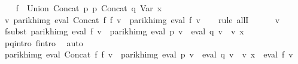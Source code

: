 \begin{isabellebody}
\ \ \isamarkupfalse%
\ {\isacharquery}{\kern0pt}f{\isacharprime}{\kern0pt}\ {\isacharequal}{\kern0pt}\ {\isachardoublequoteopen}Union\ {\isacharparenleft}{\kern0pt}Concat\ p{}\ p{}{\isacharparenright}{\kern0pt}\ {\isacharparenleft}{\kern0pt}Concat\ {\isacharquery}{\kern0pt}q{\isacharprime}{\kern0pt}\ {\isacharparenleft}{\kern0pt}Var\ x{\isacharparenright}{\kern0pt}{\isacharparenright}{\kern0pt}{\isachardoublequoteclose}\isanewline
\isanewline
\ \ \isamarkupfalse%
\ {\isachardoublequoteopen}{\isasymforall}v{\isachardot}{\kern0pt}\ {\isacharparenleft}{\kern0pt}parikh{\isacharunderscore}{\kern0pt}img\ {\isacharparenleft}{\kern0pt}eval\ {\isacharparenleft}{\kern0pt}Concat\ f{}\ f{}{\isacharparenright}{\kern0pt}\ v{\isacharparenright}{\kern0pt}\ {\isacharequal}{\kern0pt}\ parikh{\isacharunderscore}{\kern0pt}img\ {\isacharparenleft}{\kern0pt}eval\ {\isacharquery}{\kern0pt}f{\isacharprime}{\kern0pt}\ v{\isacharparenright}{\kern0pt}{\isacharparenright}{\kern0pt}{\isachardoublequoteclose}\isanewline
\ \ \isamarkupfalse%
\ {\isacharparenleft}{\kern0pt}rule\ allI{\isacharparenright}{\kern0pt}\isanewline
\ \ \ \ \isamarkupfalse%
\ v\isanewline
\ \ \ \ \isamarkupfalse%
\ f{}{\isacharunderscore}{\kern0pt}subst{\isacharcolon}{\kern0pt}\ {\isachardoublequoteopen}parikh{\isacharunderscore}{\kern0pt}img\ {\isacharparenleft}{\kern0pt}eval\ f{}\ v{\isacharparenright}{\kern0pt}\ {\isacharequal}{\kern0pt}\ parikh{\isacharunderscore}{\kern0pt}img\ {\isacharparenleft}{\kern0pt}eval\ p{}\ v\ {\isasymunion}\ eval\ q{}\ v\ {\isacharat}{\kern0pt}{\isacharat}{\kern0pt}\ v\ x{\isacharparenright}{\kern0pt}{\isachardoublequoteclose}\isanewline
\ \ \ \ \ \ \isamarkupfalse%
\ p{}{\isacharunderscore}{\kern0pt}q{}{\isacharunderscore}{\kern0pt}intro\ f{}{\isacharprime}{\kern0pt}{\isacharunderscore}{\kern0pt}intro\ \isamarkupfalse%
\ auto\isanewline
\isanewline
\ \ \ \ \isamarkupfalse%
\ {\isachardoublequoteopen}parikh{\isacharunderscore}{\kern0pt}img\ {\isacharparenleft}{\kern0pt}eval\ {\isacharparenleft}{\kern0pt}Concat\ f{}\ f{}{\isacharparenright}{\kern0pt}\ v{\isacharparenright}{\kern0pt}\ {\isacharequal}{\kern0pt}\ parikh{\isacharunderscore}{\kern0pt}img\ {\isacharparenleft}{\kern0pt}{\isacharparenleft}{\kern0pt}eval\ p{}\ v\ {\isasymunion}\ eval\ q{}\ v\ {\isacharat}{\kern0pt}{\isacharat}{\kern0pt}\ v\ x{\isacharparenright}{\kern0pt}\ {\isacharat}{\kern0pt}{\isacharat}{\kern0pt}\ eval\ f{}\ v{\isacharparenright}{\kern0pt}{\isachardoublequoteclose}\isanewline

\end{isabellebody}
